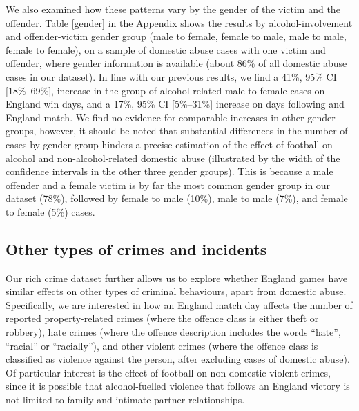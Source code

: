 \documentclass[12pt, a4paper]{article}
\begin{document}
 We also examined how these patterns vary by the gender of the victim and the offender. Table \ref{gender} in the Appendix shows the results by alcohol-involvement and offender-victim gender group (male to female, female to male, male to male, female to female), on a sample of domestic abuse cases with one victim and offender, where gender information is available (about 86\% of all domestic abuse cases in our dataset). In line with our previous results, we find a 41\%, 95\% CI [18\%--69\%], increase in the group of alcohol-related male to female cases on England win days, and a 17\%, 95\% CI [5\%--31\%] increase on days following and England match. We find no evidence for comparable increases in other gender groups, however, it should be noted that substantial differences in the number of cases by gender group hinders a precise estimation of the effect of football on alcohol and non-alcohol-related domestic abuse (illustrated by the width of the confidence intervals in the other three gender groups). This is because a male offender and a female victim is by far the most common gender group in our dataset (78\%), followed by female to male (10\%), male to male (7\%), and female to female (5\%) cases.



\subsection{Other types of crimes and incidents}

Our rich crime dataset further allows us to explore whether England games have similar effects on other types of criminal behaviours, apart from domestic abuse. Specifically, we are interested in how an England match day affects the number of reported property-related crimes (where the offence class is either theft or robbery), hate crimes (where the offence description includes the words ``hate'', ``racial'' or ``racially''), and other violent crimes (where the offence class is classified as violence against the person, after excluding cases of domestic abuse). Of particular interest is the effect of football on non-domestic violent crimes, since it is possible that alcohol-fuelled violence that follows an England victory is not limited to family and intimate partner relationships. 
\end{document}
